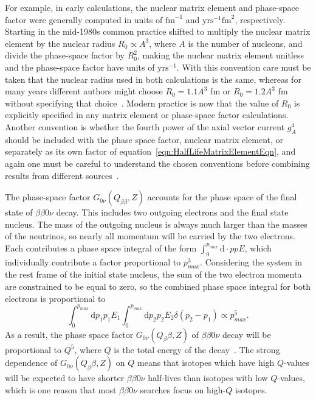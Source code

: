 For example, in early calculations, the nuclear matrix element and phase-space factor were generally computed in units of $\mathrm{fm}^{-1}$ and $\mathrm{yrs}^{-1} \mathrm{fm}^2$, respectively.  Starting in the mid-1980s common practice shifted to multiply the nuclear matrix element by the nuclear radius $R_0 \propto A^3$, where $A$ is the number of nucleons, and divide the phase-space factor by $R_0^2$, making the nuclear matrix element unitless and the phase-space factor have units of $\mathrm{yrs}^{-1}$. With this convention care must be taken that the nuclear radius used in both calculations is the same, whereas for many years different authors might choose $R_0 = 1.1 A^3$ fm or $R_0 = 1.2 A^3$ fm without specifying that choice~\cite{PhysRevC.73.028501}.  Modern practice is now that the value of $R_0$ is explicitly specified in any matrix element or phase-space factor calculations. Another convention is whether the fourth power of the axial vector current $g_A^4$ should be included with the phase space factor, nuclear matrix element, or separately as its own factor of equation~\ref{eqn:HalfLifeMatrixElementEqn}, and again one must be careful to understand the chosen conventions before combining results from different sources~\cite{PhysRevC.87.014315}.

The phase-space factor $G_{0\nu}(Q_{\beta\beta}, Z)$ accounts for the phase space of the final state of $\beta\beta 0\nu$ decay.  This includes two outgoing electrons and the final state nucleus.  The mass of the outgoing nucleus is always much larger than the masses of the neutrinos, so nearly all momentum will be carried by the two electrons.  Each contributes a phase space integral of the form $\int_0^{p_{max}} \mathrm{d}\cdot p pE$, which individually contribute a factor proportional to $p_{max}^3$.  Considering the system in the rest frame of the initial state nucleus, the sum of the two electron momenta are constrained to be equal to zero, so the combined phase space integral for both electrons is proportional to
\begin{equation}
\int_0^{p_{max}} \mathrm{d}p_1 p_1E_1 \int_0^{p_{max}} \mathrm{d}p_2 p_2E_2 \delta(p_2-p_1) \propto p_{max}^5.
\end{equation}
As a result, the phase space factor $G_{0\nu}(Q_\beta\beta, Z)$ of $\beta\beta 0\nu$ decay will be proportional to $Q^5$, where $Q$ is the total energy of the decay~\cite{mohapatra1998massive}.  The strong dependence of $G_{0\nu}(Q_\beta\beta, Z)$ on $Q$ means that isotopes which have high $Q$-values will be expected to have shorter $\beta\beta 0\nu$ half-lives than isotopes with low $Q$-values, which is one reason that most $\beta\beta 0\nu$ searches focus on high-$Q$ isotopes.

